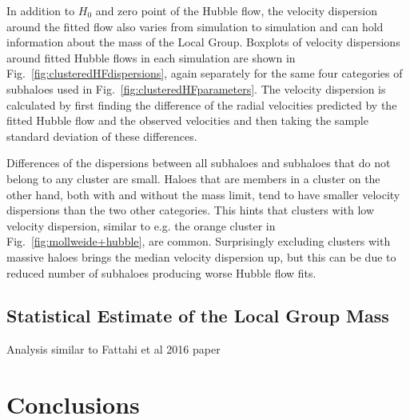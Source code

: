 \documentclass[english, oneside]{HYgradu}
\begin{document}
In addition to $H_0$ and zero point of the Hubble flow, the velocity dispersion around the fitted flow also varies from simulation to simulation and can hold information about the mass of the Local Group. Boxplots of velocity dispersions around fitted Hubble flows in each simulation are shown in Fig.~\ref{fig:clusteredHFdispersions}, again separately for the same four categories of subhaloes used in Fig.~\ref{fig:clusteredHFparameters}. The velocity dispersion is calculated by first finding the difference of the radial velocities predicted by the fitted Hubble flow and the observed velocities and then taking the sample standard deviation of these differences.

Differences of the dispersions between all subhaloes and subhaloes that do not belong to any cluster are small. Haloes that are members in a cluster on the other hand, both with and without the mass limit, tend to have smaller velocity dispersions than the two other categories. This hints that clusters with low velocity dispersion, similar to e.g. the orange cluster in Fig.~\ref{fig:mollweide+hubble}, are common. Surprisingly excluding clusters with massive haloes brings the median velocity dispersion up, but this can be due to reduced number of subhaloes producing worse Hubble flow fits.


\section{Statistical Estimate of the Local Group Mass}\label{sect:statistical_estimate}
Analysis similar to Fattahi et al 2016 paper



%
%

\chapter{Conclusions}
\end{document}
